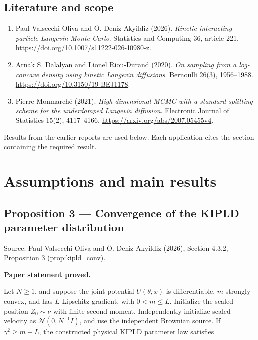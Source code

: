 \documentclass[11pt,a4paper]{report}
\begin{document}
\section*{Literature and scope}
\begin{enumerate}
\item Paul Valsecchi Oliva and Ö. Deniz Akyildiz (2026). \emph{Kinetic interacting particle Langevin Monte Carlo}. Statistics and Computing 36, article 221. \url{https://doi.org/10.1007/s11222-026-10980-z}.
\item Arnak S. Dalalyan and Lionel Riou-Durand (2020). \emph{On sampling from a log-concave density using kinetic Langevin diffusions}. Bernoulli 26(3), 1956–1988. \url{https://doi.org/10.3150/19-BEJ1178}.
\item Pierre Monmarché (2021). \emph{High-dimensional MCMC with a standard splitting scheme for the underdamped Langevin diffusion}. Electronic Journal of Statistics 15(2), 4117–4166. \url{https://arxiv.org/abs/2007.05455v4}.
\end{enumerate}
Results from the earlier reports \cite{LangevinLean2026ULASC,LangevinLean2026IPLA,LangevinLean2026Proximal,LangevinLean2026Kinetic} are used below. Each application cites the section containing the required result.

\tableofcontents
\clearpage
{}
\chapter{Assumptions and main results}
\section{\texorpdfstring{Proposition 3 — Convergence of the KIPLD parameter distribution}{Proposition 3 — Convergence of the KIPLD parameter distribution}}


Source: Paul Valsecchi Oliva and Ö. Deniz Akyildiz (2026), Section 4.3.2, Proposition 3 (prop:kipld\_conv).



\textbf{Paper statement proved.}



Let \(N\ge1\), and suppose the joint potential \(U(\theta,x)\) is differentiable, \(m\)-strongly convex, and has \(L\)-Lipschitz gradient, with \(0<m\le L\). Initialize the scaled position \(Z_0\sim\nu\) with finite second moment. Independently initialize scaled velocity as \(\mathcal N(0,N^{-1}I)\), and use the independent Brownian source. If \(\gamma^2\ge m+L\), the constructed physical KIPLD parameter law satisfies
\end{document}
